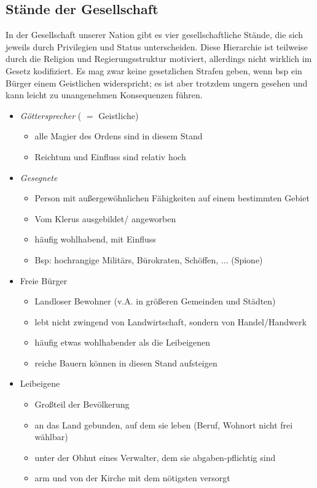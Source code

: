 \subsection{Stände der Gesellschaft}\label{ch:staende}
In der Gesellschaft unserer Nation gibt es vier gesellschaftliche Stände, die sich jeweils durch Privilegien und Status unterscheiden. 
Diese Hierarchie ist teilweise durch die Religion und Regierungsstruktur motiviert, allerdings nicht wirklich im Gesetz kodifiziert. Es mag zwar keine gesetzlichen Strafen geben, 
wenn bsp ein Bürger einem Geistlichen widerspricht; es ist aber trotzdem ungern gesehen und kann leicht zu unangenehmen Konsequenzen führen.
\begin{itemize}
	\item \emph{Göttersprecher} ( $=$ Geistliche)
		\begin{itemize}
			\item alle Magier des Ordens sind in diesem Stand
			\item Reichtum und Einfluss sind relativ hoch 
		\end{itemize}
	\item \emph{Gesegnete}
		\begin{itemize}
			\item Person mit außergewöhnlichen Fähigkeiten auf einem bestimmten Gebiet
			\item Vom Klerus ausgebildet/ angeworben
			\item häufig wohlhabend, mit Einfluss
			\item Bsp: hochrangige Militärs, Bürokraten, Schöffen,  ... (Spione)
		\end{itemize}
	\item Freie Bürger
		\begin{itemize}
			\item Landloser Bewohner (v.A. in größeren Gemeinden und Städten)
			\item lebt nicht zwingend von Landwirtschaft, sondern von Handel/Handwerk
			\item häufig etwas wohlhabender als die Leibeigenen
			\item reiche Bauern können in diesen Stand aufsteigen
		\end{itemize}
	\item Leibeigene
		\begin{itemize}
			\item Großteil der Bevölkerung
			\item an das Land gebunden, auf dem sie leben (Beruf, Wohnort nicht frei wählbar)
			\item unter der Obhut eines Verwalter, dem sie abgaben-pflichtig sind
			\item arm und von der Kirche mit dem nötigsten versorgt
		\end{itemize}
\end{itemize}

